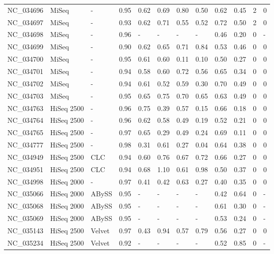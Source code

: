 \begin{table}[ht]
\begin{tabular}{llllllllllll}
  NC\_034696 & MiSeq & - & 0.95 & 0.62 & 0.69 & 0.80 & 0.50 & 0.62 & 0.45 &   2 &     0 \\ 
  NC\_034697 & MiSeq & - & 0.93 & 0.62 & 0.71 & 0.55 & 0.52 & 0.72 & 0.50 &   2 &     0 \\ 
  NC\_034698 & MiSeq & - & 0.96 & - & - & - & - & 0.46 & 0.20 &   0 & - \\ 
  NC\_034699 & MiSeq & - & 0.90 & 0.62 & 0.65 & 0.71 & 0.84 & 0.53 & 0.46 &   0 &     0 \\ 
  NC\_034700 & MiSeq & - & 0.95 & 0.61 & 0.60 & 0.11 & 0.10 & 0.50 & 0.27 &   0 &     0 \\ 
  NC\_034701 & MiSeq & - & 0.94 & 0.58 & 0.60 & 0.72 & 0.56 & 0.65 & 0.34 &   0 &     0 \\ 
  NC\_034702 & MiSeq & - & 0.94 & 0.61 & 0.52 & 0.59 & 0.30 & 0.70 & 0.49 &   0 &     0 \\ 
  NC\_034703 & MiSeq & - & 0.95 & 0.65 & 0.75 & 0.70 & 0.65 & 0.63 & 0.49 &   0 &     0 \\ 
  NC\_034763 & HiSeq 2500 & - & 0.96 & 0.75 & 0.39 & 0.57 & 0.15 & 0.66 & 0.18 &   0 &     0 \\ 
  NC\_034764 & HiSeq 2500 & - & 0.96 & 0.62 & 0.58 & 0.49 & 0.19 & 0.52 & 0.21 &   0 &     0 \\ 
  NC\_034765 & HiSeq 2500 & - & 0.97 & 0.65 & 0.29 & 0.49 & 0.24 & 0.69 & 0.11 &   0 &     0 \\ 
  NC\_034777 & HiSeq 2500 & - & 0.98 & 0.31 & 0.61 & 0.27 & 0.04 & 0.64 & 0.38 &   0 &     0 \\ 
  NC\_034949 & HiSeq 2500 & CLC & 0.94 & 0.60 & 0.76 & 0.67 & 0.72 & 0.66 & 0.27 &   0 &     0 \\ 
  NC\_034951 & HiSeq 2500 & CLC & 0.94 & 0.68 & 1.10 & 0.61 & 0.98 & 0.50 & 0.37 &   0 &     0 \\ 
  NC\_034998 & HiSeq 2000 & - & 0.97 & 0.41 & 0.42 & 0.63 & 0.27 & 0.40 & 0.35 &   0 &     0 \\ 
  NC\_035066 & HiSeq 2000 & ABySS & 0.95 & - & - & - & - & 0.42 & 0.64 &   0 & - \\ 
  NC\_035068 & HiSeq 2000 & ABySS & 0.95 & - & - & - & - & 0.61 & 0.30 &   0 & - \\ 
  NC\_035069 & HiSeq 2000 & ABySS & 0.95 & - & - & - & - & 0.53 & 0.24 &   0 & - \\ 
  NC\_035143 & HiSeq 2500 & Velvet & 0.97 & 0.43 & 0.94 & 0.57 & 0.79 & 0.56 & 0.27 &   0 &     0 \\ 
  NC\_035234 & HiSeq 2500 & Velvet & 0.92 & - & - & - & - & 0.52 & 0.85 &   0 & - \\ 

\end{tabular}
\end{table}
